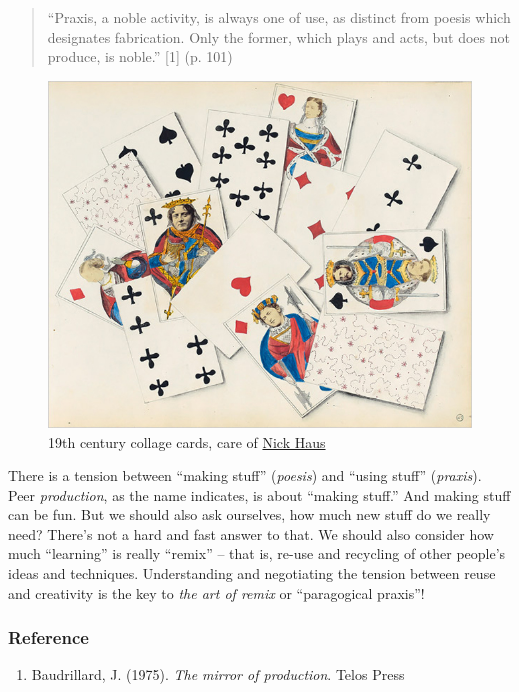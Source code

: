 \begin{quote}
``Praxis, a noble activity, is always one of use, as distinct from
poesis which designates fabrication. Only the former, which plays and
acts, but does not produce, is noble.'' {[}1{]} (p. 101)
\end{quote}
\begin{figure}
\centering
\includegraphics[width=\textwidth]{../pictures/collage.jpg}
\caption*{19th century collage cards, care of
  \href{http://www.nickhaus.com/2010/02/afternoon-remembered-complete-with.html}{Nick
    Haus}}
\end{figure}


There is a tension between ``making stuff'' (\emph{poesis}) and ``using
stuff'' (\emph{praxis}). Peer \emph{production}, as the name indicates,
is about ``making stuff.'' And making stuff can be fun. But we should
also ask ourselves, how much new stuff do we really need? There's not a
hard and fast answer to that. We should also consider how much
``learning'' is really ``remix'' -- that is, re-use and recycling of
other people's ideas and techniques. Understanding and negotiating the
tension between reuse and creativity is the key to \emph{the art of
remix} or ``paragogical praxis''!

\subsubsection{Reference}

\begin{enumerate}
\item
  Baudrillard, J. (1975). \emph{The mirror of production}. Telos Press
\end{enumerate}
